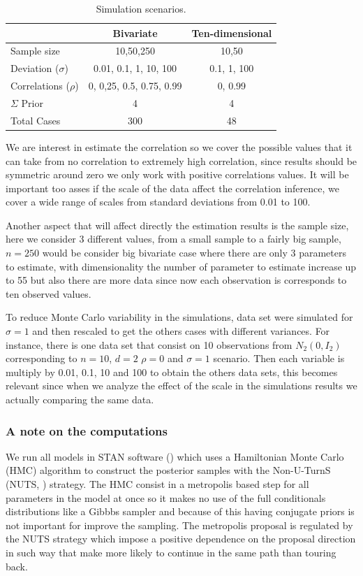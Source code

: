 \documentclass{article}
\begin{document}
\begin{table}[htbp]
   \centering
   \caption{Simulation scenarios. \label{scen}} 
     \begin{tabular}{lcc} \hline
          &  Bivariate    & Ten-dimensional  \\ \hline
      Sample size       & 10,50,250   &  10,50  \\
      Deviation ($\sigma$)  & 0.01, 0.1, 1, 10, 100 & 0.1, 1, 100 \\
      Correlations ($\rho$)   &  0, 0,25, 0.5, 0.75, 0.99  &  0, 0.99 \\
      $\Sigma$ Prior  & 4 & 4 \\ 
      Total Cases &   300 & 48 \\ \hline
   \end{tabular}
\end{table}

We are interest in estimate the correlation so we cover the possible values that it can take from no correlation to extremely high correlation, since results should be symmetric around zero we only work with positive correlations values. It will be important too asses if the scale of the data affect the correlation inference, we cover a wide range of scales from standard deviations from 0.01 to 100. 

Another aspect that will affect directly the estimation results is the sample size, here we consider 3 different values, from a small sample to a fairly big sample, $n=250$ would be consider  big bivariate case where there are only 3 parameters to estimate, with dimensionality the number of parameter to estimate increase up to 55 but also there are more data since now each observation is corresponds to ten observed values. 

To reduce Monte Carlo variability in the simulations, data set were simulated for $\sigma=1$ and then rescaled to get the others cases with different variances. For instance, there is one data set that consist on 10 observations from $N_2(0, I_2 )$ corresponding to $n=10$, $d=2$ $\rho=0$ and $\sigma=1$ scenario. Then each variable is multiply by 0.01, 0.1, 10  and 100 to obtain the others data sets, this becomes relevant since when we analyze the effect of the scale in the simulations results we actually comparing the same data. 

\subsubsection{A note on the computations}
We run all models in STAN software (\cite{stan2014}) which uses a Hamiltonian Monte Carlo (HMC) algorithm to construct the posterior samples with the Non-U-TurnS (NUTS, \cite{hoffman2011no}) strategy. The HMC consist in a metropolis based step for all parameters in the model at once so it makes no use of the full conditionals distributions like a Gibbbs sampler and because of this having conjugate priors is not important for improve the sampling. The metropolis proposal is regulated by the NUTS strategy which impose a positive dependence on the proposal direction in such way that make more likely to continue in the same path than touring back. 
\end{document}
